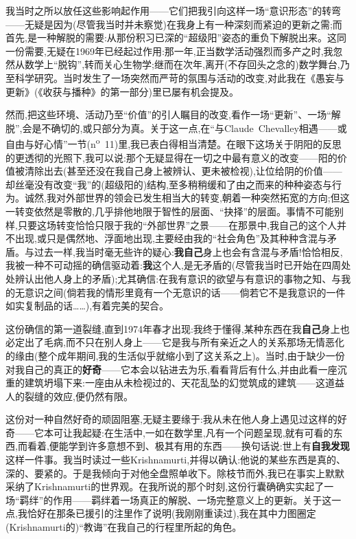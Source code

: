 我当时之所以放任这些影响起作用——它们把我引向这样一场“意识形态”的转弯——无疑是因为(尽管我当时并未察觉)在我身上有一种深刻而紧迫的更新之需;而首先,是一种解脱的需要:从那份积习已深的“超级阳”姿态的重负下解脱出来。这同一份需要,无疑在1969年已经起过作用:那一年,正当数学活动强烈而多产之时,我忽然从数学上“脱钩”,转而关心生物学;继而在次年,离开(不存回头之念的)数学舞台,乃至科学研究。当时发生了一场突然而严苛的氛围与活动的改变,对此我在《愚妄与更新》(《收获与播种》的第一部分)里已屡有机会提及。

然而,把这些环境、活动乃至“价值”的引人瞩目的改变,看作一场“更新”、一场“解脱”,会是不确切的,或只部分为真。关于这一点,在“与Claude~Chevalley相遇——或自由与好心情”一节(n\textsuperscript{o}~11)里,我已表白得相当清楚。在眼下这场关于阴阳的反思的更透彻的光照下,我可以说:那个无疑显得在一切之中最有意义的改变——阳的价值被清除出去(甚至还没在我自己身上被辨认、更未被检视),让位给阴的价值——却丝毫没有改变“我”的(超级阳的)结构,至多稍稍缓和了由之而来的种种姿态与行为。诚然,我对外部世界的领会\dmark{}已发生相当大的转变,朝着一种突然拓宽的方向;但这一转变依然是零散的,几乎排他地限于智性的层面、“抉择”的层面。事情不可能别样,只要这场转变恰恰只限于我的“外部世界”之景——在那景中,我自己的这个人并不出现,或只是偶然地、浮面地出现,主要经由我的“社会角色”及其种种含混与矛盾。与过去一样,我当时毫无些许的疑心:\textbf{我自己}身上也会有含混与矛盾!恰恰相反,我被一种不可动摇的确信驱动着:\textbf{我}这个人,是无矛盾的(尽管我当时已开始在四周处处辨认出他人身上的矛盾);尤其确信:在我有意识的欲望与有意识的事物之知、与我的无意识之间(倘若我的情形里竟有一个无意识的话——倘若它不是我意识的一件如实复制品的话……),有着完美的契合。

这份确信的第一道裂缝,直到1974年春才出现:我终于懂得,某种东西在我\textbf{自己}身上也必定出了毛病,而不只在别人身上——它是我与所有亲近之人的关系那场无情恶化的缘由(整个成年期间,我的生活似乎就缩小到了这关系之上)。当时,由于缺少一份对我自己的真正的\textbf{好奇}——它本会以钻进去为乐,看看背后有什么,并由此看一座沉重的建筑坍塌下来:一座由从未检视过的、天花乱坠的幻觉筑成的建筑——这道益人的裂缝的效应,便仍然有限。

这份对一种自然好奇的顽固阻塞,无疑主要缘于:我从未在他人身上遇见过这样的好奇——它本可让我起疑:在生活中,一如在数学里,凡有一个问题呈现,就有可看的东西,而看着,便能学到许多意想不到、极其有用的东西——换句话说:世上有\textbf{自我发现}这样一件事。我当时读过一些Krishnamurti,并得以确认:他说的某些东西是真的、深的、要紧的。于是我倾向于对他全盘照单收下。除枝节而外,我已在事实上默默采纳了Krishnamurti的世界观。\dmark{}在我所说的那个时刻,这份行囊确确实实起了一场“羁绊”的作用——羁绊着一场真正的解脱、一场完整意义上的更新。关于这一点,我恰好在那条已援引的注里作了说明(我刚刚重读过),我在其中力图圈定(Krishnamurti的)“教诲”在我自己的行程里所起的角色。

